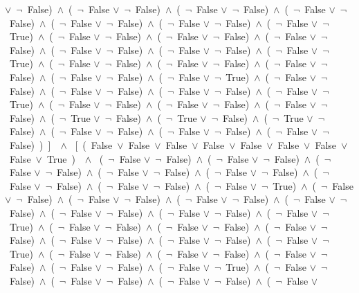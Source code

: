 ﻿\documentclass[a4paper,10pt]{article}
\begin{document}
$\vee$\  $\neg$\ False)\ $\wedge$\ (\  $\neg$\ False $\vee$\  $\neg$\ False)\ $\wedge$\ (\  $\neg$\ False $\vee$\  $\neg$\ False)\ $\wedge$\ (\  $\neg$\ False $\vee$\  $\neg$\ False)\ $\wedge$\ (\  $\neg$\ False $\vee$\  $\neg$\ False)\ $\wedge$\ (\  $\neg$\ False $\vee$\  $\neg$\ False)\ $\wedge$\ (\  $\neg$\ False $\vee$\  $\neg$\ True)\ $\wedge$\ (\  $\neg$\ False $\vee$\  $\neg$\ False)\ $\wedge$\ (\  $\neg$\ False $\vee$\  $\neg$\ False)\ $\wedge$\ (\  $\neg$\ False $\vee$\  $\neg$\ False)\ $\wedge$\ (\  $\neg$\ False $\vee$\  $\neg$\ False)\ $\wedge$\ (\  $\neg$\ False $\vee$\  $\neg$\ False)\ $\wedge$\ (\  $\neg$\ False $\vee$\  $\neg$\ True)\ $\wedge$\ (\  $\neg$\ False $\vee$\  $\neg$\ False)\ $\wedge$\ (\  $\neg$\ False $\vee$\  $\neg$\ False)\ $\wedge$\ (\  $\neg$\ False $\vee$\  $\neg$\ False)\ $\wedge$\ (\  $\neg$\ False $\vee$\  $\neg$\ False)\ $\wedge$\ (\  $\neg$\ False $\vee$\  $\neg$\ True)\ $\wedge$\ (\  $\neg$\ False $\vee$\  $\neg$\ False)\ $\wedge$\ (\  $\neg$\ False $\vee$\  $\neg$\ False)\ $\wedge$\ (\  $\neg$\ False $\vee$\  $\neg$\ False)\ $\wedge$\ (\  $\neg$\ False $\vee$\  $\neg$\ True)\ $\wedge$\ (\  $\neg$\ False $\vee$\  $\neg$\ False)\ $\wedge$\ (\  $\neg$\ False $\vee$\  $\neg$\ False)\ $\wedge$\ (\  $\neg$\ False $\vee$\  $\neg$\ False)\ $\wedge$\ (\  $\neg$\ True $\vee$\  $\neg$\ False)\ $\wedge$\ (\  $\neg$\ True $\vee$\  $\neg$\ False)\ $\wedge$\ (\  $\neg$\ True $\vee$\  $\neg$\ False)\ $\wedge$\ (\  $\neg$\ False $\vee$\  $\neg$\ False)\ $\wedge$\ (\  $\neg$\ False $\vee$\  $\neg$\ False)\ $\wedge$\ (\  $\neg$\ False $\vee$\  $\neg$\ False)\ )\ ]\ \ $\wedge$ \ [\ (\ False\ $\vee$\ False\ $\vee$\ False\ $\vee$\ False\ $\vee$\ False\ $\vee$\ False\ $\vee$\ False\ $\vee$\ False\ $\vee$\ True\ )\ \ $\wedge$ \ (\  $\neg$\ False $\vee$\  $\neg$\ False)\ $\wedge$\ (\  $\neg$\ False $\vee$\  $\neg$\ False)\ $\wedge$\ (\  $\neg$\ False $\vee$\  $\neg$\ False)\ $\wedge$\ (\  $\neg$\ False $\vee$\  $\neg$\ False)\ $\wedge$\ (\  $\neg$\ False $\vee$\  $\neg$\ False)\ $\wedge$\ (\  $\neg$\ False $\vee$\  $\neg$\ False)\ $\wedge$\ (\  $\neg$\ False $\vee$\  $\neg$\ False)\ $\wedge$\ (\  $\neg$\ False $\vee$\  $\neg$\ True)\ $\wedge$\ (\  $\neg$\ False $\vee$\  $\neg$\ False)\ $\wedge$\ (\  $\neg$\ False $\vee$\  $\neg$\ False)\ $\wedge$\ (\  $\neg$\ False $\vee$\  $\neg$\ False)\ $\wedge$\ (\  $\neg$\ False $\vee$\  $\neg$\ False)\ $\wedge$\ (\  $\neg$\ False $\vee$\  $\neg$\ False)\ $\wedge$\ (\  $\neg$\ False $\vee$\  $\neg$\ False)\ $\wedge$\ (\  $\neg$\ False $\vee$\  $\neg$\ True)\ $\wedge$\ (\  $\neg$\ False $\vee$\  $\neg$\ False)\ $\wedge$\ (\  $\neg$\ False $\vee$\  $\neg$\ False)\ $\wedge$\ (\  $\neg$\ False $\vee$\  $\neg$\ False)\ $\wedge$\ (\  $\neg$\ False $\vee$\  $\neg$\ False)\ $\wedge$\ (\  $\neg$\ False $\vee$\  $\neg$\ False)\ $\wedge$\ (\  $\neg$\ False $\vee$\  $\neg$\ True)\ $\wedge$\ (\  $\neg$\ False $\vee$\  $\neg$\ False)\ $\wedge$\ (\  $\neg$\ False $\vee$\  $\neg$\ False)\ $\wedge$\ (\  $\neg$\ False $\vee$\  $\neg$\ False)\ $\wedge$\ (\  $\neg$\ False $\vee$\  $\neg$\ False)\ $\wedge$\ (\  $\neg$\ False $\vee$\  $\neg$\ True)\ $\wedge$\ (\  $\neg$\ False $\vee$\  $\neg$\ False)\ $\wedge$\ (\  $\neg$\ False $\vee$\  $\neg$\ False)\ $\wedge$\ (\  $\neg$\ False $\vee$\  $\neg$\ False)\ $\wedge$\ (\  $\neg$\ False $\vee$\  
\end{document}
